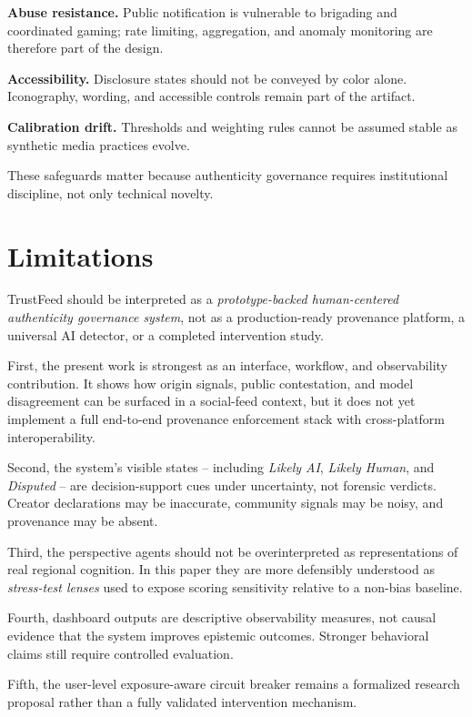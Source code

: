 \documentclass[acmlarge,screen,nonacm]{acmart}
\begin{document}
\textbf{Abuse resistance.} Public notification is vulnerable to brigading and coordinated gaming; rate limiting, aggregation, and anomaly monitoring are therefore part of the design.

\textbf{Accessibility.} Disclosure states should not be conveyed by color alone. Iconography, wording, and accessible controls remain part of the artifact.

\textbf{Calibration drift.} Thresholds and weighting rules cannot be assumed stable as synthetic media practices evolve.

These safeguards matter because authenticity governance requires institutional discipline, not only technical novelty.

\section{Limitations}

TrustFeed should be interpreted as a \emph{prototype-backed human-centered authenticity governance system}, not as a production-ready provenance platform, a universal AI detector, or a completed intervention study.

First, the present work is strongest as an interface, workflow, and observability contribution. It shows how origin signals, public contestation, and model disagreement can be surfaced in a social-feed context, but it does not yet implement a full end-to-end provenance enforcement stack with cross-platform interoperability.

Second, the system's visible states -- including \emph{Likely AI}, \emph{Likely Human}, and \emph{Disputed} -- are decision-support cues under uncertainty, not forensic verdicts. Creator declarations may be inaccurate, community signals may be noisy, and provenance may be absent.

Third, the perspective agents should not be overinterpreted as representations of real regional cognition. In this paper they are more defensibly understood as \emph{stress-test lenses} used to expose scoring sensitivity relative to a non-bias baseline.

Fourth, dashboard outputs are descriptive observability measures, not causal evidence that the system improves epistemic outcomes. Stronger behavioral claims still require controlled evaluation.

Fifth, the user-level exposure-aware circuit breaker remains a formalized research proposal rather than a fully validated intervention mechanism.
\end{document}
